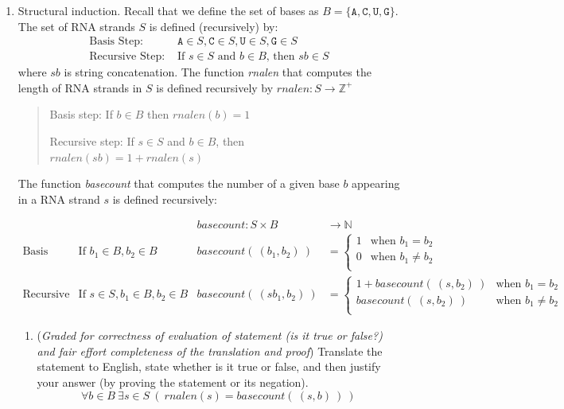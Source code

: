 \documentclass[12pt, oneside]{article}
\newcommand{\A}[0]{\texttt{A}}
\newcommand{\C}[0]{\texttt{C}}
\newcommand{\G}[0]{\texttt{G}}
\newcommand{\U}[0]{\texttt{U}}
\begin{document}
\begin{enumerate}[labelindent=0pt, leftmargin=0pt]
\begin{enumerate}
    \end{enumerate}
    
    \item Structural induction. Recall that we define the set of bases as $B  =  \{ \A, \C, \U, \G \}$.
The set of RNA strands $S$ is defined (recursively) by:
\[
\begin{array}{ll}
\textrm{Basis Step: } & \A \in S, \C \in S, \U \in S, \G \in S \\
\textrm{Recursive Step: } & \textrm{If } s \in S\textrm{ and }b \in B \textrm{, then }sb \in S
\end{array}
\]
where $sb$ is string concatenation. 
The function \textit{rnalen} that computes the length of RNA strands in $S$ is defined recursively by
$rnalen: S  \to \mathbb{Z}^+$


\begin{quote}
Basis step: If $b \in B$ then $rnalen(b)  = 1$

Recursive step: If $s \in S$ and $b \in B$, then $rnalen(sb)  = 1 + rnalen(s)$
\end{quote}

The function \textit{basecount} that computes the number of a given base 
$b$ appearing in a RNA strand $s$ is defined recursively:
    
\[
\begin{array}{llll}
& & \textit{basecount} : S \times B & \to \mathbb{N} \\
\textrm{Basis Step:} &  \textrm{If } b_1 \in B, b_2 \in B & \textit{basecount}(~(b_1, b_2)~) & =
        \begin{cases}
            1 & \textrm{when } b_1 = b_2 \\
            0 & \textrm{when } b_1 \neq b_2 \\
        \end{cases} \\
\textrm{Recursive Step:} & \textrm{If } s \in S, b_1 \in B, b_2 \in B &\textit{basecount}(~(s b_1, b_2)~) & =
        \begin{cases}
            1 + \textit{basecount}(~(s, b_2)~) & \textrm{when } b_1 = b_2 \\
            \textit{basecount}(~(s, b_2)~) & \textrm{when } b_1 \neq b_2 \\
        \end{cases}
\end{array}
\]
\begin{enumerate}
\item ({\it Graded for correctness of evaluation of statement (is it true or false?) and fair effort completeness of the translation and proof}) 
Translate the statement to English, state whether is it true or false, and then justify your answer (by proving the statement or its negation).
$$\forall b \in B ~\exists s \in S ~(~rnalen(s) = basecount(~(s,b)~)~)$$


\end{enumerate}
\end{enumerate}
\end{document}
